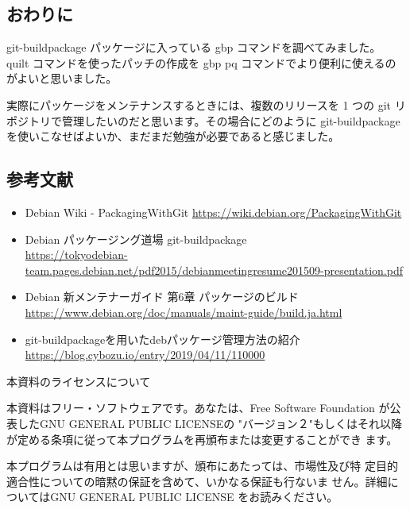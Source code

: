 \documentclass[mingoth,a4paper]{jsarticle}
\begin{document}
\subsection{おわりに}

git-buildpackage パッケージに入っている gbp コマンドを調べてみました。
quilt コマンドを使ったパッチの作成を gbp pq コマンドでより便利に使えるのがよいと思いました。

実際にパッケージをメンテナンスするときには、複数のリリースを 1 つの git リポジトリで管理したいのだと思います。その場合にどのように git-buildpackage を使いこなせばよいか、まだまだ勉強が必要であると感じました。


\subsection{参考文献}

\begin{itemize}
  \item Debian Wiki - PackagingWithGit \url{https://wiki.debian.org/PackagingWithGit}
  \item Debian パッケージング道場 git-buildpackage\\ \url{https://tokyodebian-team.pages.debian.net/pdf2015/debianmeetingresume201509-presentation.pdf}
  \item Debian 新メンテナーガイド 第6章 パッケージのビルド \\ \url{https://www.debian.org/doc/manuals/maint-guide/build.ja.html}
  \item git-buildpackageを用いたdebパッケージ管理方法の紹介 \\ \url{https://blog.cybozu.io/entry/2019/04/11/110000}
\end{itemize}


\newpage

\begin{center}
本資料のライセンスについて
\end{center}

\begin{fontsize}{6}{6}

本資料はフリー・ソフトウェアです。あなたは、Free Software
Foundation が公表したGNU GENERAL PUBLIC LICENSEの "バージョン２"もしくはそれ以降
が定める条項に従って本プログラムを再頒布または変更することができ
ます。

本プログラムは有用とは思いますが、頒布にあたっては、市場性及び特
定目的適合性についての暗黙の保証を含めて、いかなる保証も行ないま
せん。詳細についてはGNU GENERAL PUBLIC LICENSE をお読みください。

\end{fontsize}
\end{document}
